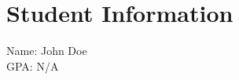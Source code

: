 \documentclass[a4paper,12pt]{article}
\begin{document}
\ifdefined\gpa
\else
    \def\gpa{N/A}
\fi

\section*{Student Information}
Name: John Doe \\
GPA: \gpa
\end{document}
